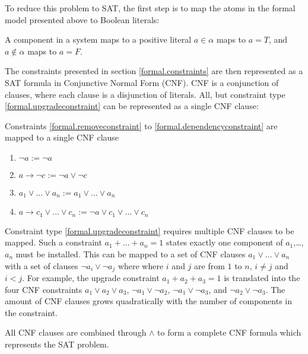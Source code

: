 To reduce this problem to SAT, the first step is to map the atoms in the formal model presented above to Boolean literals:
\begin{defs}
A component in a system maps to a positive literal $a \in \alpha$ maps to $a = T$, and $a \not \in \alpha$ maps to $a = F$.
\end{defs}

The constraints presented in section \ref{formal.constraints} are then represented as a SAT formula in Conjunctive Normal Form (CNF).
CNF is a conjunction of clauses, where each clause is a disjunction of literals.
All, but constraint type \ref{formal.upgradeconstraint} can be represented as a single CNF clause:

Constraints \ref{formal.removeconstraint} to \ref{formal.dependencyconstraint} are mapped to a single CNF clause
\begin{enumerate}
  \item $\neg a := \neg a$
  \item $a \rightarrow \neg c := \neg a \vee \neg c$ 
  \item $a_1 \vee \ldots \vee a_n := a_1 \vee \ldots \vee a_n$ 
  \item $a \rightarrow c_1 \vee \ldots \vee c_n := \neg a \vee c_1 \vee \ldots \vee c_n$ 
\end{enumerate}

Constraint type \ref{formal.upgradeconstraint} requires multiple CNF clauses to be mapped.
Such a constraint $a_1 + \ldots + a_n = 1$ states exactly one component of $a_1$,\ldots,$a_n$ must be installed.
This can be mapped to a set of CNF clauses $a_1 \vee \ldots \vee a_n$ with a set of clauses $\neg a_i \vee \neg a_j$ where where $i$ and $j$ are from $1$ to $n$, $i \neq j$ and $i < j$.
For example, the upgrade constraint $a_1 + a_2 + a_3 = 1$ is translated into the four CNF constraints $a_1 \vee a_2 \vee a_3$, $\neg a_1 \vee \neg a_2$, $\neg a_1 \vee \neg a_3$, 
and $\neg a_2 \vee \neg a_3$.
The amount of CNF clauses grows quadratically with the number of components in the constraint. 

All CNF clauses are combined through $\wedge$ to form a complete CNF formula which represents the SAT problem.

